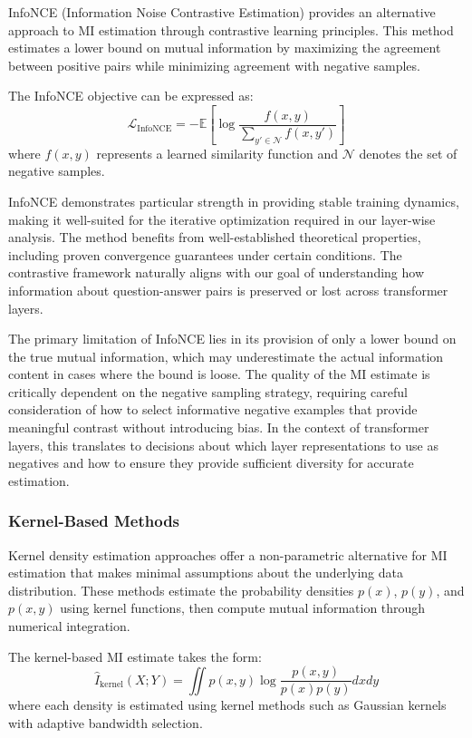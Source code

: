InfoNCE (Information Noise Contrastive Estimation) \citep{oord2018representation} provides an alternative approach to MI estimation through contrastive learning principles. This method estimates a lower bound on mutual information by maximizing the agreement between positive pairs while minimizing agreement with negative samples.

The InfoNCE objective can be expressed as:
\[
\mathcal{L}_{\text{InfoNCE}} = -\mathbb{E}\left[\log\frac{f(x,y)}{\sum_{y' \in \mathcal{N}} f(x,y')}\right]
\]
where $f(x,y)$ represents a learned similarity function and $\mathcal{N}$ denotes the set of negative samples.

InfoNCE demonstrates particular strength in providing stable training dynamics, making it well-suited for the iterative optimization required in our layer-wise analysis. The method benefits from well-established theoretical properties, including proven convergence guarantees under certain conditions. The contrastive framework naturally aligns with our goal of understanding how information about question-answer pairs is preserved or lost across transformer layers.

The primary limitation of InfoNCE lies in its provision of only a lower bound on the true mutual information, which may underestimate the actual information content in cases where the bound is loose. The quality of the MI estimate is critically dependent on the negative sampling strategy, requiring careful consideration of how to select informative negative examples that provide meaningful contrast without introducing bias. In the context of transformer layers, this translates to decisions about which layer representations to use as negatives and how to ensure they provide sufficient diversity for accurate estimation.

\subsubsection{Kernel-Based Methods}

Kernel density estimation approaches offer a non-parametric alternative for MI estimation that makes minimal assumptions about the underlying data distribution. These methods estimate the probability densities $p(x)$, $p(y)$, and $p(x,y)$ using kernel functions, then compute mutual information through numerical integration.

The kernel-based MI estimate takes the form:
\[
\hat{I}_{\text{kernel}}(X;Y) = \iint p(x,y) \log\frac{p(x,y)}{p(x)p(y)} dx dy
\]
where each density is estimated using kernel methods such as Gaussian kernels with adaptive bandwidth selection.

